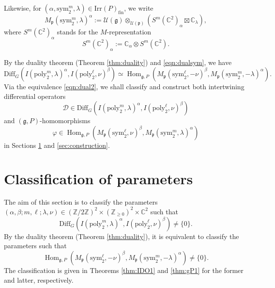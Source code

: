 \documentclass[reqno,11pt]{amsart}
\theoremstyle{remark}
\numberwithin{equation}{section}
\newcommand{\gb}{\beta}
\newcommand{\ga}{\alpha}
\newcommand{\fg}{{\mathfrak g}}
\newcommand{\fp}{{\mathfrak p}}
\newcommand{\C}{\mathbb{C}}
\newcommand{\Z}{\mathbb{Z}}
\newcommand{\Cal}{\mathcal}
\newcommand{\Hom}{\operatorname{Hom}}
\newcommand{\poly}{\mathrm{poly}}
\newcommand{\Diff}{\mathrm{Diff}}
\newcommand{\Irr}{\mathrm{Irr}}
\newcommand{\fin}{\mathrm{fin}}
\newcommand{\sym}{\mathrm{sym}}
\newcommand{\D}{\Cal{D}}
\begin{document}
Likewise, for $(\ga, \sym_2^m, \lambda) \in \Irr(P)_{\fin}$,
we write 
\begin{equation}\label{eqn:Verma}
M_\fp(\sym_2^m,\lambda)^\ga 
:=\Cal{U}(\fg) \otimes_{\Cal{U}(\fp)}(S^m(\C^2)_\ga\boxtimes \C_\lambda),
\end{equation}
where $S^m(\C^2)_\ga$ stands for the $M$-representation
\begin{equation*}
S^m(\C^2)_\ga:=\C_{\ga} \otimes S^m(\C^2).
\end{equation*}

\vskip 0.1in

By the duality theorem (Theorem \ref{thm:duality}) and \eqref{eqn:dualsym}, we have 
\begin{equation}\label{eqn:dual2}
\Diff_G(I(\poly_2^m, \lambda)^\ga, I(\poly_2^\ell,  \nu)^\beta)
\simeq
\Hom_{\fg, P}(M_\fp(\sym_2^\ell,-\nu)^\gb, M_\fp(\sym_2^m, -\lambda)^\ga).
\end{equation}
Via the equivalence \eqref{eqn:dual2},
we shall classify and construct both intertwining differential operators 
\begin{equation*}
\D \in 
\Diff_G(I(\poly_2^m, \lambda)^\ga, I(\poly_2^\ell,  \nu)^\beta)
\end{equation*}
and $(\fg, P)$-homomorphisms
\begin{equation*}
\varphi \in \Hom_{\fg, P}(M_\fp(\sym_2^\ell,\nu)^\gb, M_\fp(\sym_2^m, \lambda)^\ga)
\end{equation*}
in Sections \ref{sec:classification} and \ref{sec:construction}.

\section{Classification of parameters}
\label{sec:classification}

The aim of this section is to classify the 
parameters $(\ga, \gb; m, \ell; \lambda, \nu) \in 
(\Z/2\Z)^2\times (\Z_{\geq 0})^2 \times \C^2$ such that
\begin{equation*}
\Diff_G(I(\poly_2^m, \lambda)^\ga, I(\poly_2^\ell,  \nu)^\beta)\neq \{0\}.
\end{equation*}
By the duality theorem (Theorem \ref{thm:duality}), 
it is equivalent to classify the parameters such that
\begin{equation*}
 \Hom_{\fg, P}(M_\fp(\sym_2^\ell,-\nu)^\gb, M_\fp(\sym_2^m, -\lambda)^\ga) \neq \{0\}.
\end{equation*}
The classification is given in 
Theorems \ref{thm:IDO1} and \ref{thm:gP1}
for the former and  latter, respectively.
\end{document}
